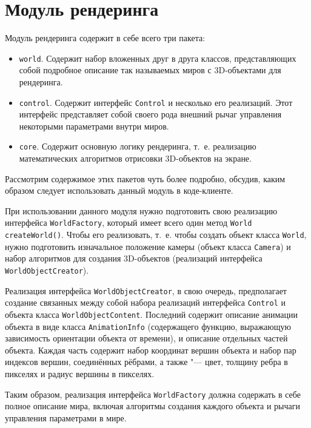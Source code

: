 \section{Модуль рендеринга}

Модуль рендеринга содержит в себе всего три пакета:

\begin{itemize}

\item \texttt{world}. Содержит набор вложенных друг в друга классов, представляющих собой подробное описание так
называемых миров с 3D-объектами для рендеринга.
\item \texttt{control}. Содержит интерфейс \texttt{Control} и несколько его реализаций. Этот интерфейс представляет
собой своего рода внешний рычаг управления некоторыми параметрами внутри миров.
\item \texttt{core}. Содержит основную логику рендеринга, т.~е. реализацию математических алгоритмов отрисовки
3D-объектов на экране.

\end{itemize}

Рассмотрим содержимое этих пакетов чуть более подробно, обсудив, каким образом следует использовать данный модуль
в коде-клиенте.

При использовании данного модуля нужно подготовить свою реализацию интерфейса \texttt{World\-Factory}, который имеет
всего один метод \texttt{World create\-World()}. Чтобы его реализовать, т.~е. чтобы создать объект класса \texttt{World},
нужно подготовить изначальное положение камеры (объект класса \texttt{Camera}) и набор алгоритмов для создания
3D-объектов (реализаций интерфейса \texttt{World\-ObjectCreator}).

Реализация интерфейса \texttt{WorldObjectCreator}, в свою очередь, предполагает создание связанных между собой набора
реализаций интерфейса \texttt{Con\-trol} и объекта класса \texttt{WorldObjectContent}. Последний содержит описание
анимации объекта в виде класса \texttt{AnimationInfo} (содержащего функцию, выражающую зависимость ориентации объекта
от времени), и описание отдельных частей объекта. Каждая часть содержит набор координат вершин объекта и набор пар
индексов вершин, соединённых рёбрами, а также "--- цвет, толщину ребра в пикселях и радиус вершины в пикселях.

Таким образом, реализация интерфейса \texttt{World\-Factory} должна содержать в себе полное описание мира, включая
алгоритмы создания каждого объекта и рычаги управления параметрами в мире.


